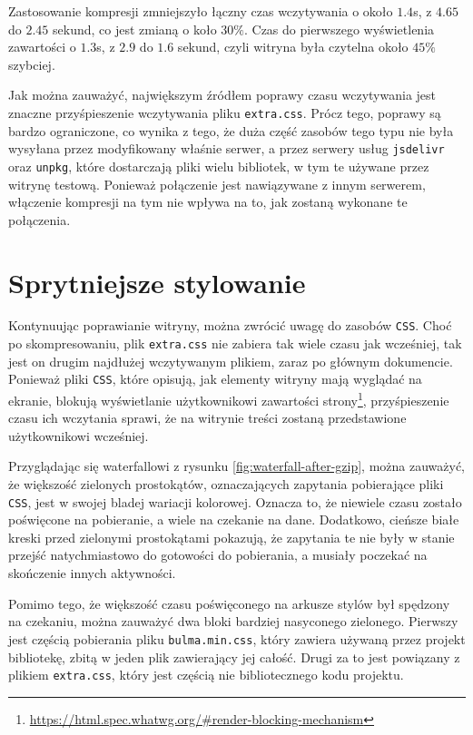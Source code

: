 \documentclass[licencjacka]{pracadypl}
\begin{document}
Zastosowanie kompresji zmniejszyło łączny czas wczytywania o około $1.4$s, z $4.65$ do $2.45$ sekund, co jest zmianą o koło $30\%$. Czas do pierwszego wyświetlenia zawartości o $1.3$s, z $2.9$ do $1.6$ sekund, czyli witryna była czytelna około $45\%$ szybciej.

Jak można zauważyć, największym źródłem poprawy czasu wczytywania jest znaczne przyśpieszenie wczytywania pliku \texttt{extra.css}. Prócz tego, poprawy są bardzo ograniczone, co wynika z tego, że duża część zasobów tego typu nie była wysyłana przez modyfikowany właśnie serwer, a przez serwery usług \texttt{jsdelivr} oraz \texttt{unpkg}, które dostarczają pliki wielu bibliotek, w tym te używane przez witrynę testową. Ponieważ połączenie jest nawiązywane z innym serwerem, włączenie kompresji na tym nie wpływa na to, jak zostaną wykonane te połączenia.




\section{Sprytniejsze stylowanie}

Kontynuując poprawianie witryny, można zwrócić uwagę do zasobów \texttt{CSS}. Choć po skompresowaniu, plik \texttt{extra.css} nie zabiera tak wiele czasu jak wcześniej, tak jest on drugim najdłużej wczytywanym plikiem, zaraz po głównym dokumencie. Ponieważ pliki \texttt{CSS}, które opisują, jak elementy witryny mają wyglądać na ekranie, blokują wyświetlanie użytkownikowi zawartości strony\footnote{\url{https://html.spec.whatwg.org/\#render-blocking-mechanism}}, przyśpieszenie czasu ich wczytania sprawi, że na witrynie treści zostaną przedstawione użytkownikowi wcześniej.

Przyglądając się waterfallowi z rysunku \ref{fig:waterfall-after-gzip}, można zauważyć, że większość zielonych prostokątów, oznaczających zapytania pobierające pliki \texttt{CSS}, jest w swojej bladej wariacji kolorowej. Oznacza to, że niewiele czasu zostało poświęcone na pobieranie, a wiele na czekanie na dane. Dodatkowo, cieńsze białe kreski przed zielonymi prostokątami pokazują, że zapytania te nie były w stanie przejść natychmiastowo do gotowości do pobierania, a musiały poczekać na skończenie innych aktywności. 

Pomimo tego, że większość czasu poświęconego na arkusze stylów był spędzony na czekaniu, można zauważyć dwa bloki bardziej nasyconego zielonego. Pierwszy jest częścią pobierania pliku \texttt{bulma.min.css}, który zawiera używaną przez projekt bibliotekę, zbitą w jeden plik zawierający jej całość. Drugi za to jest powiązany z plikiem \texttt{extra.css}, który jest częścią nie bibliotecznego kodu projektu.
\end{document}
